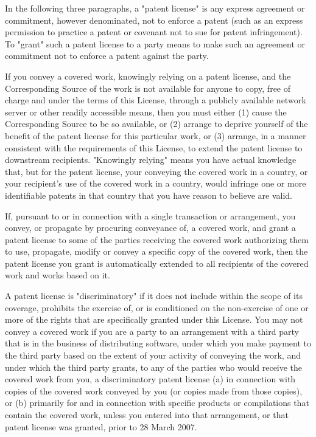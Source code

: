 \documentclass[11pt]{book}
\begin{document}
    In the following three paragraphs, a "patent license" is any express
    agreement or commitment, however denominated, not to enforce a patent
    (such as an express permission to practice a patent or covenant not to
    sue for patent infringement).  To "grant" such a patent license to a
    party means to make such an agreement or commitment not to enforce a
    patent against the party.

    If you convey a covered work, knowingly relying on a patent license,
    and the Corresponding Source of the work is not available for anyone
    to copy, free of charge and under the terms of this License, through a
    publicly available network server or other readily accessible means,
    then you must either (1) cause the Corresponding Source to be so
    available, or (2) arrange to deprive yourself of the benefit of the
    patent license for this particular work, or (3) arrange, in a manner
    consistent with the requirements of this License, to extend the patent
    license to downstream recipients.  "Knowingly relying" means you have
    actual knowledge that, but for the patent license, your conveying the
    covered work in a country, or your recipient's use of the covered work
    in a country, would infringe one or more identifiable patents in that
    country that you have reason to believe are valid.

    If, pursuant to or in connection with a single transaction or
    arrangement, you convey, or propagate by procuring conveyance of, a
    covered work, and grant a patent license to some of the parties
    receiving the covered work authorizing them to use, propagate, modify
    or convey a specific copy of the covered work, then the patent license
    you grant is automatically extended to all recipients of the covered
    work and works based on it.

    A patent license is "discriminatory" if it does not include within
    the scope of its coverage, prohibits the exercise of, or is
    conditioned on the non-exercise of one or more of the rights that are
    specifically granted under this License.  You may not convey a covered
    work if you are a party to an arrangement with a third party that is
    in the business of distributing software, under which you make payment
    to the third party based on the extent of your activity of conveying
    the work, and under which the third party grants, to any of the
    parties who would receive the covered work from you, a discriminatory
    patent license (a) in connection with copies of the covered work
    conveyed by you (or copies made from those copies), or (b) primarily
    for and in connection with specific products or compilations that
    contain the covered work, unless you entered into that arrangement,
    or that patent license was granted, prior to 28 March 2007.
\end{document}
